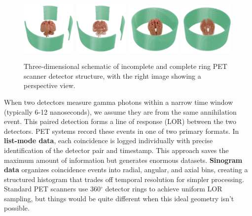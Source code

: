 \documentclass[
reprint,
superscriptaddress,
nofootinbib,
amsmath,amssymb,
aps,
prd,
]{revtex4-2}
\begin{document}
\begin{figure}[htbp]
    \centering
    \vspace{-0.2cm}
    \includegraphics[width=0.24\textwidth]{Images/Thehumanbrainismissing5}
    \includegraphics[width=0.24\textwidth]{Images/Thehumanbrainismissing4}
    \includegraphics[width=0.24\textwidth]{Images/Thehumanbrainisnotmissing3}
    \includegraphics[width=0.24\textwidth]{Images/Thehumanbrainisnotmissing4}
    \vspace{-0.2cm}
    \caption{Three-dimensional schematic of incomplete and complete ring PET scanner detector structure, with the right image showing a perspective view.}
    \vspace{-0.2cm}
    \label{fig:pet_structures2}
\end{figure}

When two detectors measure gamma photons within a narrow time window (typically 6-12 nanoseconds), we assume they are from the same annihilation event. This paired detection forms a line of response (LOR) between the two detectors.
PET systems record these events in one of two primary formats. In \textbf{list-mode data}, each coincidence is logged individually with precise identification of the detector pair and timestamp. This approach saves the maximum amount of information but generates enormous datasets. \textbf{Sinogram data} organizes coincidence events into radial, angular, and axial bins, creating a structured histogram that trades off temporal resolution for simpler processing. Standard PET scanners use 360$^\circ$ detector rings to achieve uniform LOR sampling, but things would be quite different when this ideal geometry isn't possible.
\end{document}
